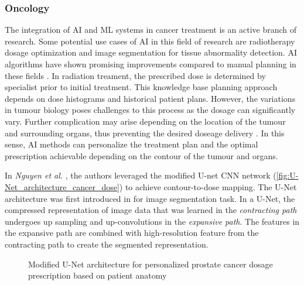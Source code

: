 \documentclass{article}
\begin{document}
\subsubsection{Oncology}
The integration of AI and ML systems in cancer treatment is an active branch of research.
Some potential use cases of AI in this field of research are radiotherapy dosage optimization and image segmentation for tissue abnormality detection. AI algorithms have shown promising improvements compared to manual planning in these fields \cite{thompson_artificial_2018}.
In radiation treament, the prescribed dose is determined by specialist prior to initial treatment. This knowledge base planning approach depends on dose histograms and historical patient plans. However, the variations in tumour biology poses challenges to this process as the dosage can significantly vary. Further complication may arise depending on the location of the tumour and surrounding organs, thus preventing the desired doseage delivery \cite{huynh_artificial_2020}. In this sense, AI methods can personalize the treatment plan and the optimal prescription achievable depending on the contour of the tumour and organs.

In \textit{Nguyen et al.} \cite{nguyen_feasibility_2019}, the authors leveraged the modified U-net CNN network (\autoref{fig:U-Net_architecture_cancer_dose}) to achieve contour-to-dose mapping. The U-Net architecture was first introduced in \cite{ronneberger_u-net_2015} for image segmentation task. In a U-Net, the compressed representation of image data that was learned in the \textit{contracting path} undergoes up sampling and up-convolutions in the \textit{expansive path}. The features in the expansive path are combined with high-resolution feature from the contracting path to create the segmented representation.

\begin{figure}[h]
    \caption{Modified U-Net architecture for personalized prostate cancer dosage prescription based on patient anatomy}
    \label{fig:U-Net_architecture_cancer_dose}
\end{figure}
\end{document}
